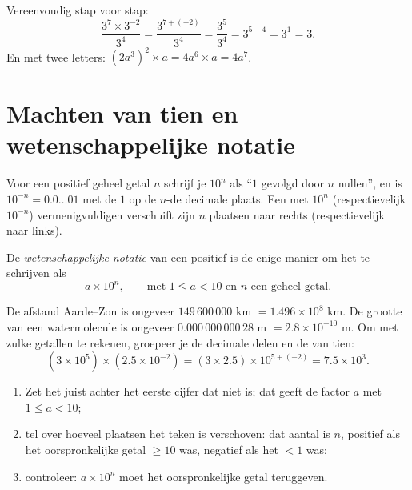 \begin{example}\label{ex:g9:fractions:rules}
Vereenvoudig stap voor stap:
\[
\frac{3^7 \times 3^{-2}}{3^4}
= \frac{3^{7 + (-2)}}{3^4}
= \frac{3^5}{3^4}
= 3^{5-4} = 3^1 = 3 .
\]
En met twee letters: $(2a^3)^2 \times a = 4 a^6 \times a = 4a^7$.
\end{example}

\section{Machten van tien en wetenschappelijke notatie}

\begin{proposition}\label{prop:g9:fractions:ten}
Voor een positief geheel getal $n$ schrijf je $10^n$ als ``$1$ gevolgd door $n$
nullen'', en is $10^{-n} = 0.0\dots01$ met de $1$ op de $n$-de decimale plaats.
Een  met $10^n$ (respectievelijk $10^{-n}$) vermenigvuldigen
verschuift zijn  $n$ plaatsen naar rechts (respectievelijk naar
links).
\end{proposition}

\begin{definition}\label{def:g9:fractions:scientific}
De \emph{wetenschappelijke notatie} van een
positief  is de enige manier om het te schrijven als
\[
a \times 10^n,
\qquad\text{met } 1 \leq a < 10 \text{ en } n \text{ een geheel getal.}
\]
\end{definition}

\begin{example}\label{ex:g9:fractions:scientific}
De afstand Aarde--Zon is ongeveer $149\,600\,000$ km $= 1.496 \times 10^8$ km. De
grootte van een watermolecule is ongeveer $0.000\,000\,000\,28$ m
$= 2.8 \times 10^{-10}$ m. Om met zulke getallen te rekenen, groepeer je de
decimale delen en de  van tien:
\[
(3 \times 10^5) \times (2.5 \times 10^{-2})
= (3 \times 2.5) \times 10^{5 + (-2)}
= 7.5 \times 10^{3}.
\]
\end{example}

\begin{method}\label{met:g9:fractions:scientific}
\begin{enumerate}
  \item Zet het  juist achter het eerste cijfer dat niet  is; dat
        geeft de factor $a$ met $1 \leq a < 10$;
  \item tel over hoeveel plaatsen het teken is verschoven: dat aantal is $n$,
        positief als het oorspronkelijke getal $\geq 10$ was, negatief als het
        $< 1$ was;
  \item controleer: $a \times 10^n$ moet het oorspronkelijke getal teruggeven.
\end{enumerate}
\end{method}


